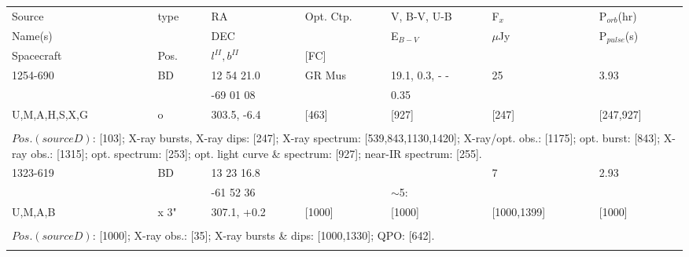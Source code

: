 \documentclass{aa}
\begin{document}
\begin{tabular}{p{2.5cm}p{1cm}p{1.8cm}p{2.3cm}p{3.3cm}p{2.0cm}p{2.2cm}}
\noalign{\smallskip}
\multicolumn{7}{p{17.5cm}}{Table 1.  (continued) }\\        
\hline
\noalign{\smallskip}
Source           & type  & RA                       &  Opt. Ctp. & V, B-V, U-B  & F$_{x}$          & P$_{orb}$(hr)    \\
Name(s)         &            & DEC                    &                     & E$_{B-V}$   & $\mu$Jy        & P$_{pulse}$(s) \\
Spacecraft   & Pos.  & $l^{II}, b^{II}$      &  [FC]           &                       &                         &                             \\
\noalign{\smallskip} 
\hline

\noalign{\smallskip}
1254-690              & BD           & 12 54 21.0     & GR Mus          & 19.1, 0.3, - -          & 25                  & 3.93               \\
                               &                  & -69 01 08        &                           &  0.35                     &                       &                        \\
U,M,A,H,S,X,G    & o              & 303.5, -6.4      & [463]                & [927]                      & [247]             & [247,927]      \\
\\
\multicolumn{7}{p{17.5cm}}{
$Pos. (source D)$: [103]; X-ray bursts, X-ray dips: [247]; X-ray spectrum: [539,843,1130,1420]; X-ray/opt. obs.: [1175]; 
opt. burst: [843]; X-ray obs.: [1315]; opt. spectrum: [253]; opt. light curve \& spectrum: [927]; near-IR spectrum: [255].}\\
\noalign{\smallskip}
\hline

\noalign{\smallskip}
1323-619            & BD      & 13 23 16.8      &                    &                        & 7                        & 2.93    \\
                             &             & -61 52 36        &                    & $\sim$5:        &                           &             \\
U,M,A,B             & x 3"     & 307.1, +0.2     & [1000]          & [1000]              & [1000,1399]       & [1000]   \\
\\
\multicolumn{7}{p{17.5cm}}{
$Pos. (source D)$: [1000]; X-ray obs.: [35]; X-ray bursts \& dips: [1000,1330]; QPO: [642].}\\
\noalign{\smallskip}
\hline


\end{tabular}
\end{document}
